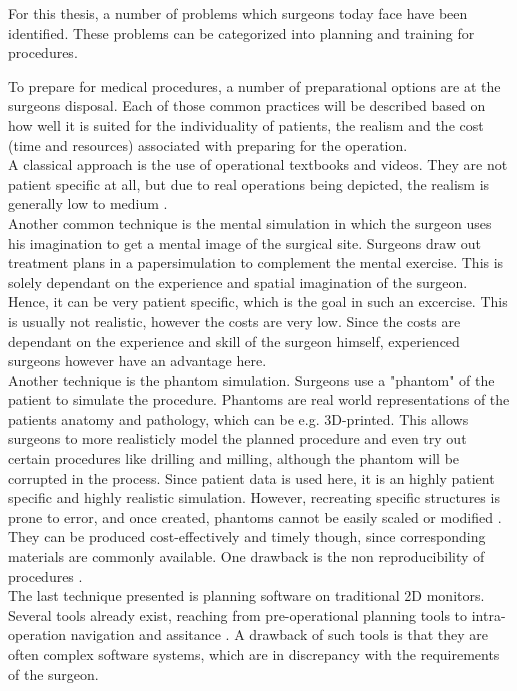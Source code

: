 For this thesis, a number of problems which surgeons today face have been identified.
These problems can be categorized into planning and training for procedures.

To prepare for medical procedures, a number of preparational options are at the surgeons disposal.
Each of those common practices will be described based on how well it is suited for the individuality of patients, the realism and the cost (time and resources) 
associated with preparing for the operation.
\\ A classical approach is the use of operational textbooks and videos.
They are not patient specific at all, but due to real operations being depicted, the realism is generally low to medium \cite{Ellis.2005}.
\\ Another common technique is the mental simulation in which the surgeon uses his imagination to get a mental image of the surgical site.
Surgeons draw out treatment plans in a papersimulation to complement the mental exercise.
This is solely dependant on the experience and spatial imagination of the surgeon. 
Hence, it can be very patient specific, which is the goal in such an excercise.
This is usually not realistic, however the costs are very low.
Since the costs are dependant on the experience and skill of the surgeon himself, experienced surgeons however have an advantage here.
\\ Another technique is the phantom simulation.
Surgeons use a "phantom" of the patient to simulate the procedure.
Phantoms are real world representations of the patients anatomy and pathology, which can be e.g. 3D-printed.
This allows surgeons to more realisticly model the planned procedure and even try out certain procedures like drilling and milling, although the phantom will be corrupted in the process.
Since patient data is used here, it is an highly patient specific and highly realistic simulation.
However, recreating specific structures is prone to error, and once created, phantoms cannot be easily scaled or modified \cite{TejoOtero.2020}.
\\ They can be produced cost-effectively and timely though, since corresponding materials are commonly available.
One drawback is the non reproducibility of procedures \cite{richardson2015cost}.
\\ The last technique presented is planning software on traditional 2D monitors.
Several tools already exist, reaching from pre-operational planning tools to intra-operation navigation and assitance \cite{HASSFELD20012}.
A drawback of such tools is that they are often complex software systems, which are in discrepancy with the requirements of the surgeon.
